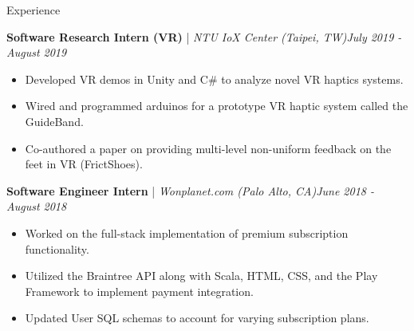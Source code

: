 \documentclass{resume} %
\begin{document}
\begin{rSection}{Experience}
\begin{rSubsection}{{\bf Software Research Intern (VR)} | {\em NTU IoX Center (Taipei, TW)}}{\em July 2019 - August 2019}{}{}
\begin{itemize}
\item Developed VR demos in Unity and C\# to analyze novel VR haptics systems. \vspace{-0.6em}
\item Wired and programmed arduinos for a prototype VR haptic system called the GuideBand.\vspace{-0.6em}
\item Co-authored a paper on providing multi-level non-uniform feedback on the feet in VR (FrictShoes).

\end{itemize}
\end{rSubsection}
\begin{rSubsection}{{\bf Software Engineer Intern} | {\em Wonplanet.com (Palo Alto, CA)}}{\em June 2018 - August 2018}{}{}
\begin{itemize}
\item Worked on the full-stack implementation of premium subscription functionality.\vspace{-0.6em}
\item Utilized the Braintree API along with Scala, HTML, CSS, and the Play Framework to implement payment integration.\vspace{-0.6em}
\item Updated User SQL schemas to account for varying subscription plans.\vspace{-0.6em}
\end{itemize}
\end{rSubsection}
\end{rSection}
\end{document}

